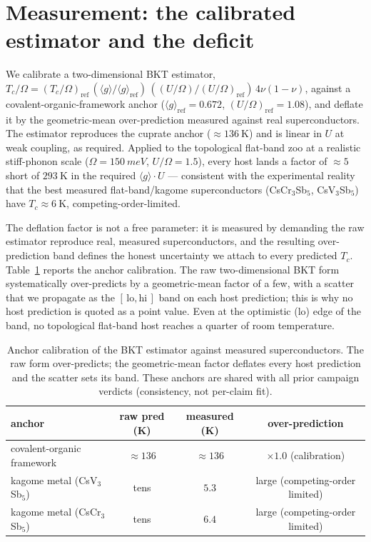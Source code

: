 \documentclass[11pt,a4paper]{article}
\newcommand{\qgg}{\langle g \rangle}
\begin{document}
\section{Measurement: the calibrated estimator and the deficit}
\label{sec:meas}
We calibrate a two-dimensional BKT estimator,
$T_c/\Omega = (T_c/\Omega)_{\mathrm{ref}}\,(\qgg/\qgg_{\mathrm{ref}})\,((U/\Omega)/(U/\Omega)_{\mathrm{ref}})\,4\nu(1-\nu)$,
against a covalent-organic-framework anchor ($\qgg_{\mathrm{ref}}=0.672$, $(U/\Omega)_{\mathrm{ref}}=1.08$),
and deflate it by the geometric-mean over-prediction measured against real superconductors. The
estimator reproduces the cuprate anchor ($\approx\SI{136}{\kelvin}$) and is linear in $U$ at weak
coupling, as required. Applied to the topological flat-band zoo at a realistic stiff-phonon scale
($\Omega=\SI{150}{meV}$, $U/\Omega=1.5$), every host lands a factor of $\approx 5$ short of
$\SI{293}{\kelvin}$ in the required $\qgg\!\cdot\!U$ --- consistent with the experimental reality that
the best measured flat-band/kagome superconductors (CsCr$_3$Sb$_5$, CsV$_3$Sb$_5$) have
$T_c \approx \SI{6}{\kelvin}$, competing-order-limited.

The deflation factor is not a free parameter: it is measured by demanding the raw estimator
reproduce real, measured superconductors, and the resulting over-prediction band defines the
honest uncertainty we attach to every predicted $T_c$. Table~\ref{tab:anchor} reports the anchor
calibration. The raw two-dimensional BKT form systematically over-predicts by a geometric-mean
factor of a few, with a scatter that we propagate as the $[\,\mathrm{lo},\mathrm{hi}\,]$ band on
each host prediction; this is why no host prediction is quoted as a point value. Even at the
optimistic ($\mathrm{lo}$) edge of the band, no topological flat-band host reaches a quarter of
room temperature.

\begin{table}[h]
\centering\small
\caption{Anchor calibration of the BKT estimator against measured superconductors. The raw form
over-predicts; the geometric-mean factor deflates every host prediction and the scatter sets its
band. These anchors are shared with all prior campaign verdicts (consistency, not per-claim fit).}
\label{tab:anchor}
\begin{tabular}{@{}lccc@{}}
\toprule
anchor & raw pred (K) & measured (K) & over-prediction \\
\midrule
covalent-organic framework & $\approx 136$ & $\approx 136$ & $\times 1.0$ (calibration) \\
kagome metal (CsV$_3$Sb$_5$) & tens & $5.3$ & large (competing-order limited) \\
kagome metal (CsCr$_3$Sb$_5$) & tens & $6.4$ & large (competing-order limited) \\
\bottomrule
\end{tabular}
\end{table}
\end{document}
